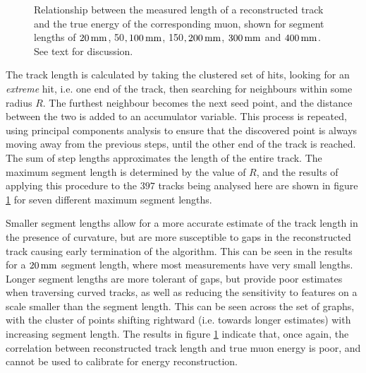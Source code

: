 \begin{figure}
{    }
    \caption[Relationship between track length and muon energy]{\label{fig:energy-recon-track-length}Relationship between the measured length of a reconstructed track and the true energy of the corresponding muon, shown for segment lengths of $20\,\mathrm{mm}$, 50\mm$, 100\,\mathrm{mm}$, 150\mm$, 200\,\mathrm{mm}$, $300\,\mathrm{mm}$ and $400\,\mathrm{mm}$. See text for discussion.}    
\end{figure}

The track length is calculated by taking the clustered set of hits, looking for an \emph{extreme} hit, i.e. one end of the track, then searching for neighbours within some radius $R$. The furthest neighbour becomes the next seed point, and the distance between the two is added to an accumulator variable. This process is repeated, using principal components analysis to ensure that the discovered point is always moving away from the previous steps, until the other end of the track is reached. The sum of step lengths approximates the length of the entire track. The maximum segment length is determined by the value of $R$, and the results of applying this procedure to the $397$ tracks being analysed here are shown in figure \ref{fig:energy-recon-track-length} for seven different maximum segment lengths.

Smaller segment lengths allow for a more accurate estimate of the track length in the presence of curvature, but are more susceptible to gaps in the reconstructed track causing early termination of the algorithm. This can be seen in the results for a $20\,\mathrm{mm}$ segment length, where most measurements have very small lengths. Longer segment lengths are more tolerant of gaps, but provide poor estimates when traversing curved tracks, as well as reducing the sensitivity to features on a scale smaller than the segment length. This can be seen across the set of graphs, with the cluster of points shifting rightward (i.e. towards longer estimates) with increasing segment length. The results in figure \ref{fig:energy-recon-track-length} indicate that, once again, the correlation between reconstructed track length and true muon energy is poor, and cannot be used to calibrate for energy reconstruction.

